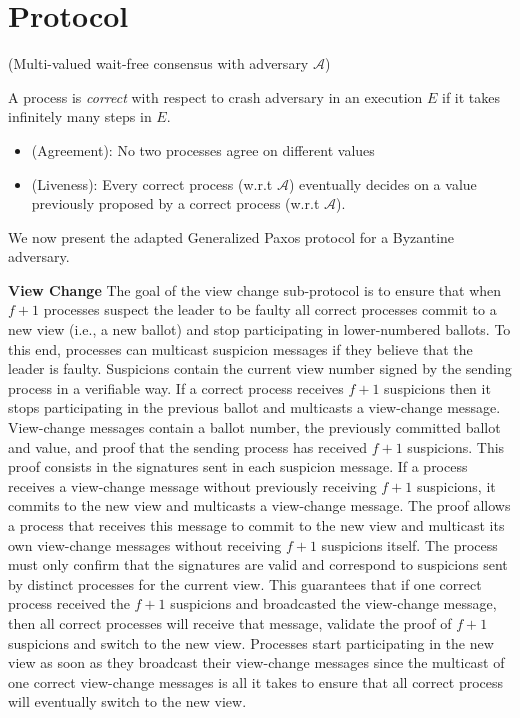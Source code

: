 \section{Protocol}
%
\begin{definition}
(Multi-valued wait-free consensus with adversary $\mathcal{A}$)

A process is \emph{correct} with respect to crash adversary 
in an execution $E$ if it takes infinitely many steps in $E$.
%
\begin{itemize}
\item (Agreement): No two processes agree on different values  
\item (Liveness): Every correct process (w.r.t $\mathcal{A}$) 
eventually decides on a value previously proposed by a correct process (w.r.t $\mathcal{A}$).
\end{itemize}
%
\end{definition}
%

%
\newpage
We now present the adapted Generalized Paxos protocol for a Byzantine adversary.\par
\textbf{View Change} The goal of the view change sub-protocol is to ensure that when $f+1$ processes suspect the leader to be faulty all correct processes commit to a new view (i.e., a new ballot) and stop participating in lower-numbered ballots. To this end, processes can multicast suspicion messages if they believe that the leader is faulty. Suspicions contain the current view number signed by the sending process in a verifiable way. If a correct process receives $f+1$ suspicions then it stops participating in the previous ballot and multicasts a view-change message. View-change messages contain a ballot number, the previously committed ballot and value, and proof that the sending process has received $f+1$ suspicions. This proof consists in the signatures sent in each suspicion message. If a process receives a view-change message without previously receiving $f+1$ suspicions, it commits to the new view and multicasts a view-change message.  The proof allows a process that receives this message to commit to the new view and multicast its own view-change messages without receiving $f+1$ suspicions itself. The process must only confirm that the signatures are valid and correspond to suspicions sent by distinct processes for the current view. This guarantees that if one correct process received the $f+1$ suspicions and broadcasted the view-change message, then all correct processes will receive that message, validate the proof of $f+1$ suspicions and switch to the new view. Processes start participating in the new view as soon as they broadcast their view-change messages since the multicast of one correct view-change messages is all it takes to ensure that all correct process will eventually switch to the new view. \par

